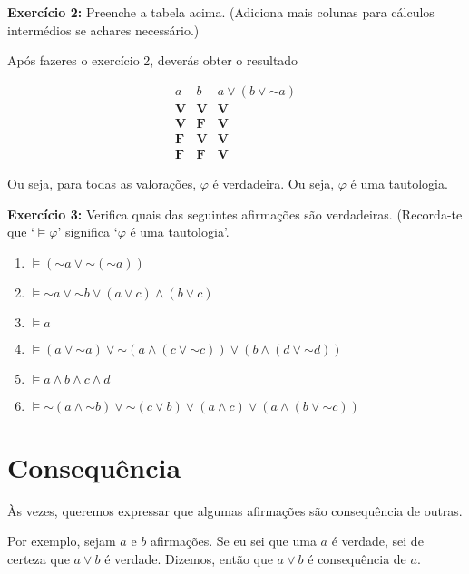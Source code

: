 \documentclass{article}
\theoremstyle{definition}
\theoremstyle{remark}
\newcommand{\V}{\mathbf{V}}
\newcommand{\F}{\mathbf{F}}
\newcommand*{\lneg}{\mathord{\sim}}
\begin{document}
	\textbf{Exercício 2:} Preenche a tabela acima. (Adiciona mais colunas para cálculos intermédios se achares necessário.)
	
	\smallskip
	
	Após fazeres o exercício 2, deverás obter o resultado
	
	\[
	\begin{array}{c|c|c}
	a & b & a \lor (b \lor \lneg a)\\
	\hline
	\V & \V &\V\\
	\V & \F &\V\\
	\F & \V &\V\\
	\F & \F &\V
	\end{array}
	\]
	
	Ou seja, para todas as valorações, $\varphi$ é verdadeira. Ou seja, $\varphi$ é uma tautologia.
	
	\smallskip
	
	\textbf{Exercício 3:} Verifica quais das seguintes afirmações são verdadeiras. (Recorda-te que `$\vDash \varphi$' significa `$\varphi$ é uma tautologia'.
	
	\begin{enumerate}
	\item $\vDash (\lneg a \lor \lneg (\lneg a))$
	
	\item $\vDash \lneg a \lor \lneg b \lor (a \lor c) \land (b \lor c)$
	
	\item $\vDash a$
	
	\item $\vDash (a \lor \lneg a) \lor \lneg (a \land (c \lor \lneg c)) \lor (b \land (d \lor \lneg d))$
	
	\item $\vDash a \land b \land c \land d$
	
	\item $\vDash \lneg (a \land \lneg b) \lor \lneg(c \lor b) \lor (a \land c) \lor (a \land (b \lor \lneg c))$
	\end{enumerate}
	
	\section{Consequência}
	
	Às vezes, queremos expressar que algumas afirmações são consequência de outras.
	
	Por exemplo, sejam $a$ e $b$ afirmações. Se eu sei que uma $a$ é verdade, sei de certeza que $a \lor b$ é verdade. Dizemos, então que $a \lor b$ é consequência de $a$.
	
\end{document}
